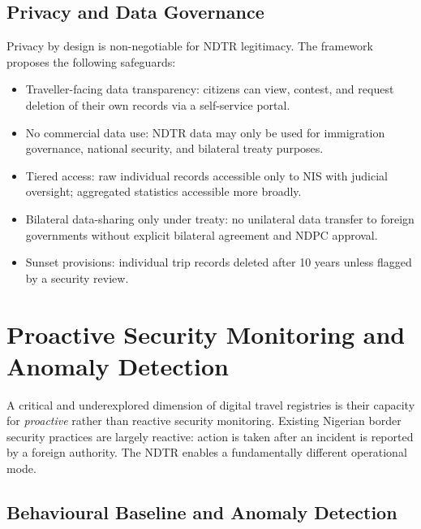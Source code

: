 \documentclass[11pt]{article}
\begin{document}
\subsection{Privacy and Data Governance}

Privacy by design is non-negotiable for NDTR legitimacy.
The framework proposes the following safeguards:

\begin{itemize}
  \item Traveller-facing data transparency: citizens can view, contest,
  and request deletion of their own records via a self-service portal.

  \item No commercial data use: NDTR data may only be used for
  immigration governance, national security, and bilateral treaty
  purposes.

  \item Tiered access: raw individual records accessible only to NIS
  with judicial oversight; aggregated statistics accessible more broadly.

  \item Bilateral data-sharing only under treaty: no unilateral data
  transfer to foreign governments without explicit bilateral agreement
  and NDPC approval.

  \item Sunset provisions: individual trip records deleted after
  10 years unless flagged by a security review.
\end{itemize}

\section{Proactive Security Monitoring and Anomaly Detection}
\label{sec:security}

A critical and underexplored dimension of digital travel registries
is their capacity for \textit{proactive} rather than reactive security
monitoring. Existing Nigerian border security practices are largely
reactive: action is taken after an incident is reported by a foreign
authority. The NDTR enables a fundamentally different operational mode.

\subsection{Behavioural Baseline and Anomaly Detection}
\end{document}
